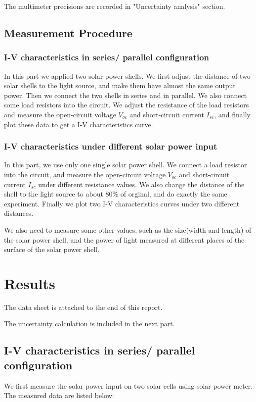 \documentclass[12pt, a4paper]{article}
\begin{document}
The multimeter precisions are recorded in "Uncertainty analysis" section.

\subsection{Measurement Procedure}
\subsubsection{I-V characteristics in series/ parallel configuration}
In this part we applied two solar power shells. We first adjust the distance of two 
solar shells to the light source, and make them have almost the same output power. 
Then we connect the two shells in series and in parallel. We also connect some load resistors 
into the circuit. We adjust the resistance of the load resistors and measure the open-circuit 
voltage $V_{oc}$ and short-circuit current $I_{sc}$, and finally plot these data to get a 
I-V characteristics curve.

\subsubsection{I-V characteristics under different solar power input}
In this part, we use only one single solar power shell. We connect a load resistor into the circuit, 
and measure the open-circuit voltage $V_{oc}$ and short-circuit current $I_{sc}$ under different 
resistance values. We also change the distance of the shell to the light source to about $80\%$ of orginal, 
and do exactly the same experiment. Finally we plot two I-V characteristics curves under two different distances.

We also need to measure some other values, such as the size(width and length) of the solar power shell, and 
the power of light measured at different places of the surface of the solar power shell.

\section{Results}
The data sheet is attached to the end of this report.

The uncertainty calculation is included in the next part.

\subsection{I-V characteristics in series/ parallel configuration}
We first measure the solar power input on two solar cells using solar power meter. The 
measured data are listed below:
\end{document}

